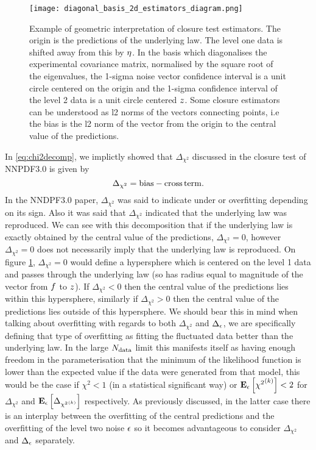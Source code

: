 \begin{figure}
    \centering
    \texttt{[image: diagonal\_basis\_2d\_estimators\_diagram.png]}
    \caption{Example of geometric interpretation of closure test estimators. The origin
    is the predictions of the underlying law. The level one data is shifted away from this
    by $\eta$. In the basis which diagonalises the experimental covariance matrix, normalised by
    the square root of the eigenvalues, the 1-sigma noise vector confidence interval
    is a unit circle centered on the origin and the 1-sigma confidence interval
    of the level 2 data is a unit circle centered $z$. Some closure
    estimators can be understood as l2 norms of the vectors connecting points,
    i.e the bias is the l2 norm of the vector from the origin to the central
    value of the predictions.}
    \label{fig:diagram2destimators}
\end{figure}

In \eqref{eq:chi2decomp}, we implictly showed that $\Delta_{\chi^2}$ discussed
in the closure test of NNPDF3.0 is given by
\begin{equation}
    \Delta_{\chi^2} = {\rm bias} - {\rm cross\,term}.
\end{equation}
In the NNDPF3.0 paper, $\Delta_{\chi^2}$ was said to indicate under or overfitting
depending on its sign. Also it was said that $\Delta_{\chi^2}$ indicated that
the underlying law was reproduced. We can see with this decomposition that
if the underlying law is exactly obtained by the central value of the predictions,
$\Delta_{\chi^2}=0$, however $\Delta_{\chi^2}=0$ does not necessarily imply that
the underlying law is reproduced. On figure \ref{fig:diagram2destimators},
$\Delta_{\chi^2} = 0$ would define a hypersphere which is centered on the level
1 data and passes through the underlying law (so has radius equal to magnitude of
the vector from $f$ to $z$). If $\Delta_{\chi^2} < 0$ then the central
value of the predictions lies within this hypersphere, similarly if
$\Delta_{\chi^2} > 0$ then the central value of the predictions lies outside
of this hypersphere. We should bear this in mind when talking about overfitting
with regards to both $\Delta_{\chi^2}$ and $\Delta_{\epsilon}$, we are specifically
defining that type of overfitting as fitting the fluctuated data better than
the underlying law. In the large $N_{\rm data}$ limit this manifests itself as
having enough freedom in the parameterisation that the minimum of the likelihood
function is lower than the expected value if the data were generated from that
model, this would be the case if $\chi^2 < 1$
(in a statistical significant way) or $\mathbf{E}_{\epsilon}\left[ {\chi^2}^{(k)} \right] < 2$ for
$\Delta_{\chi^2}$ and $\mathbf{E}_{\epsilon}\left[ \Delta_{{\chi^2}^{(k)}} \right]$ respectively. As previously discussed,
in the latter case there is an interplay between the overfitting of the central
predictions and the overfitting of the level two noise $\epsilon$ so it becomes
advantageous to consider $\Delta_{\chi^2}$ and $\Delta_{\epsilon}$ separately.

